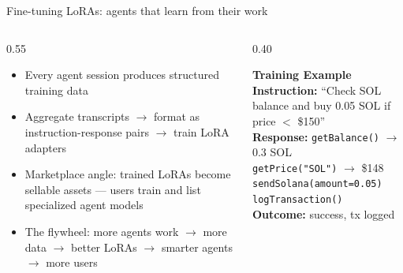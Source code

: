 \documentclass[aspectratio=169]{beamer}
\begin{document}
\begin{frame}{Fine-tuning LoRAs: agents that learn from their work}
  \vspace{10pt}
  \begin{columns}[T]
    \begin{column}{0.55\textwidth}
      \begin{itemize}
        \footnotesize
        \item Every agent session produces \alert{structured training data}
        \item Aggregate transcripts $\to$ format as instruction-response pairs $\to$ train LoRA adapters
        \item \alert{Marketplace angle:} trained LoRAs become sellable assets --- users train and list specialized agent models
        \item \alert{The flywheel:} more agents work $\to$ more data $\to$ better LoRAs $\to$ smarter agents $\to$ more users
      \end{itemize}
    \end{column}
    \begin{column}{0.40\textwidth}
      \vspace{-0.5cm}
      \begin{tcolorbox}[colback=bglight, colframe=accent, sharp corners, boxrule=0.5pt]
        \scriptsize\color{textmain}
        \textbf{Training Example}\\[3pt]
        \textbf{Instruction:} ``Check SOL balance and buy 0.05 SOL if price $<$ \$150''\\[3pt]
        \textbf{Response:} \texttt{getBalance()} $\to$ 0.3 SOL\\
        \texttt{getPrice("SOL")} $\to$ \$148\\
        \texttt{sendSolana(amount=0.05)}\\
        \texttt{logTransaction()}\\[3pt]
        \textbf{Outcome:} success, tx logged
      \end{tcolorbox}
    \end{column}
  \end{columns}
\end{frame}
\end{document}
